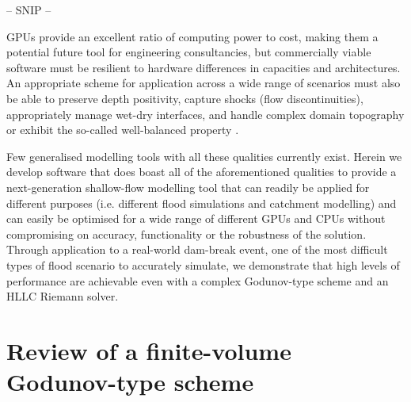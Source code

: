 -- SNIP --

GPUs provide an excellent ratio of computing power to cost, making them a potential future tool for engineering consultancies, but commercially viable software must be resilient to hardware differences in capacities and architectures. An appropriate scheme for application across a wide range of scenarios must also be able to preserve depth positivity, capture shocks (flow discontinuities), appropriately manage wet-dry interfaces, and handle complex domain topography or exhibit the so-called well-balanced property \citep{Xing2010,Murillo2010}. 

Few generalised modelling tools with all these qualities currently exist. Herein we develop software that does boast all of the aforementioned qualities to provide a next-generation shallow-flow modelling tool that can readily be applied for different purposes (i.e. different flood simulations and catchment modelling) and can easily be optimised for a wide range of different GPUs and CPUs without compromising on accuracy, functionality or the robustness of the solution. Through application to a real-world dam-break event, one of the most difficult types of flood scenario to accurately simulate, we demonstrate that high levels of performance are achievable even with a complex Godunov-type scheme and an HLLC Riemann solver. 

\section{Review of a finite-volume Godunov-type scheme}

